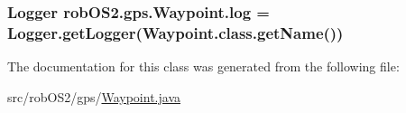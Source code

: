 \label{classrob_o_s2_1_1gps_1_1_waypoint_a9858d8ec37deed55a6456eba501591c8}
\hypertarget{classrob_o_s2_1_1gps_1_1_waypoint_a294f2a97d0c2ab20acb4de448a72753c}{
\subsubsection[{log}]{\setlength{\rightskip}{0pt plus 5cm}Logger {\bf robOS2.gps.Waypoint.log} = Logger.getLogger(Waypoint.class.getName())}}
\label{classrob_o_s2_1_1gps_1_1_waypoint_a294f2a97d0c2ab20acb4de448a72753c}


The documentation for this class was generated from the following file:\begin{DoxyCompactItemize}
\item 
src/robOS2/gps/\hyperlink{_waypoint_8java}{Waypoint.java}\end{DoxyCompactItemize}
